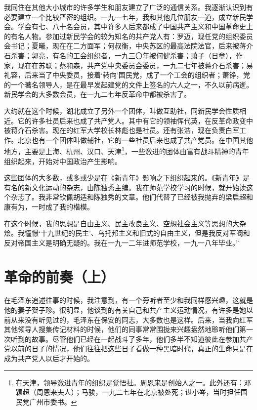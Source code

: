 \documentclass[10pt]{book}
\begin{document}
我同住在其他大小城市的许多学生和朋友建立了广泛的通信关系。我逐渐认识到有必要建立一个比较严密的组织。一九一七年，我和其他几位朋友一道，成立新民学会。学会有七、八十名会员，其中许多人后来都成了中国共产主义和中国革命史上的有名人物。参加过新民学会的较为知名的共产党人有：罗迈，现任党的组织委员会书记；夏曦，现在在二方面军；何叔衡，中央苏区的最高法院法官，后来被蒋介石杀害；郭亮，有名的工会组织者，一九三〇年被何健杀害；萧子（日章），作家，现在在苏联；蔡和森，共产党中央委员会委员，一九二七年被蒋介石杀害；易礼容，后来当了中央委员，接着‘转向’国民党，成了一个工会的组织者；萧铮，党的一个著名领导人，是在最早发起建党的文件上签名的六人之一，不久以前病逝。新民学会的大多数会员，在一九二七年反革命中都被杀害了。

大约就在这个时候，湖北成立了另外一个团体，叫做互助社，同新民学会性质相近。它的许多社员后来也成了共产党人。其中有它的领袖恽代英，在反革命政变中被蒋介石杀害。现在的红军大学校长林彪也是社员。还有张浩，现在负责白军工作。北京也有一个团体叫做辅社，它的一些社员后来也成了共产党员。在中国其他地方，主要是上海、杭州、汉口、天津\footnote{在天津，领导激进青年的组织是觉悟社。周恩来是创始人之一。此外还有：邓颖超（周恩来夫人）；马骏，一九二七年在北京被处死；谌小岑，当时担任国民党广州市委书。}，一些激进的团体由富有战斗精神的青年组织起来，开始对中国政治产生影响。

这些团体的大多数，或多或少是在《新青年》影响之下组织起来的。《新青年》是有名的新文化运动的杂志，由陈独秀主编。我在师范学校学习的时候，就开始读这个杂志了。我非常钦佩胡适和陈独秀的文章。他们代替了已经被我抛弃的梁启超和康有为，一时成了我的楷模。

在这个时候，我的思想是自由主义、民主改良主义、空想社会主义等思想的大杂烩。我憧憬‘十九世纪的民主’、乌托邦主义和旧式的自由主义，但是我反对军阀和反对帝国主义是明确无疑的。我在一九一二年进师范学校，一九一八年毕业。”



\section{革命的前奏（上）}

在毛泽东追述往事的时候，我注意到，有一个旁听者至少和我同样感兴趣，这就是他的妻子贺子珍。很明显，他谈到的有关自己和共产主义运动情况，有许多是她以前从来没有听见过的，毛泽东在保安的同志，大多数也是这样。后来，当我向红军其他领导人搜集传记材料的时候，他们的同事常常围拢来兴趣盎然地聆听他们第一次听到的故事。尽管他们已经在一起战斗了多年，他们多半不知道彼此在参加共产党以前的日子的情况，他们往往把这些日子看做一种黑暗时代，真正的生命只是在成为共产党人以后才开始的。
\end{document}
